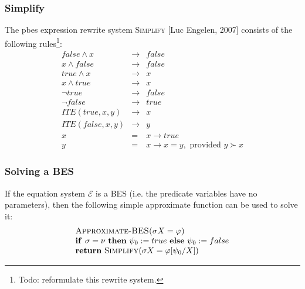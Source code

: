 \documentclass{article}
\begin{document}
\subsubsection{Simplify}

The pbes expression rewrite system \textsc{Simplify} [Luc Engelen, 2007]
consists of the following rules\footnote{%
Todo: reformulate this rewrite system.}:%
\begin{eqnarray*}
false\wedge x &\rightarrow &false \\
x\wedge false &\rightarrow &false \\
true\wedge x &\rightarrow &x \\
x\wedge true &\rightarrow &x \\
\lnot true &\rightarrow &false \\
\lnot false &\rightarrow &true \\
ITE(true,x,y) &\rightarrow &x \\
ITE(false,x,y) &\rightarrow &y \\
x &=&x\rightarrow true \\
y &=&x\rightarrow x=y,\text{ provided }y\succ x
\end{eqnarray*}

\subsubsection{Solving a BES}

If the equation system $\mathcal{E}$ is a BES (i.e. the predicate variables
have no parameters), then the following simple approximate function can be
used to solve it:%
\begin{equation*}
\begin{array}{l}
\text{\textsc{Approximate-BES(}}\sigma X=\varphi \text{\textsc{)}} \\
\text{\textbf{if }}\sigma =\nu \text{ \textbf{then} }\psi _{0}:=true \text{
\textbf{else} }\psi _{0}:=false \\
\text{\textbf{return} \textsc{Simplify}(}\sigma X=\varphi \lbrack \psi
_{0}/X]\text{)}%
\end{array}%
\end{equation*}

\newpage

\appendix
\end{document}
